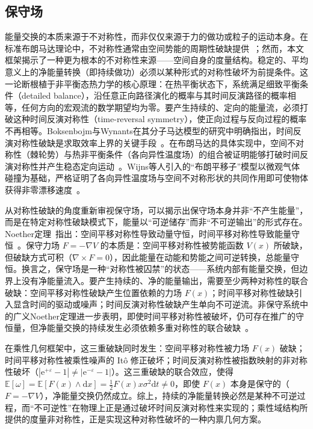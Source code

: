 ﻿\documentclass[10pt,a4paper]{article}
\numberwithin{equation}{section}
\begin{document}
\subsection{保守场}

能量交换的本质来源于不对称性，而非仅仅来源于力的做功或粒子的运动本身。在标准布朗马达理论中，不对称性通常由空间势能的周期性破缺提供~\cite{Reimann2002Brownian, Hanggi2009Brownian}；然而，本文框架揭示了一种更为根本的不对称性来源——空间自身的度量结构。稳定的、平均意义上的净能量转换（即持续做功）必须以某种形式的对称性破坏为前提条件。这一论断根植于非平衡态热力学的核心原理：在热平衡状态下，系统满足细致平衡条件（detailed balance），沿任意正向路径演化的概率与其时间反演路径的概率相等，任何方向的宏观流的数学期望均为零。要产生持续的、定向的能量流，必须打破这种时间反演对称性（time-reversal symmetry），使正向过程与反向过程的概率不再相等。Boksenbojm与Wynants在其分子马达模型的研究中明确指出，时间反演对称性破缺是求取效率上界的关键手段~\cite{Boksenbojm2009Entropy}。在布朗马达的具体实现中，空间不对称性（棘轮势）与热非平衡条件（各向异性温度场）的组合被证明能够打破时间反演对称性并产生稳态定向运动~\cite{Wijns2024Microscopic, Movilla2024Application}。Wijns等人引入的“布朗平移子”模型以微观气体碰撞为基础，严格证明了各向异性温度场与空间不对称形状的共同作用即可使物体获得非零漂移速度~\cite{Wijns2024Microscopic}。

从对称性破缺的角度重新审视保守场，可以揭示出保守场本身并非“不产生能量”，而是在特定对称性破缺模式下，能量以“可逆储存”而非“不可逆输出”的形式存在。Noether定理~\cite{Noether1918Invariante}指出：空间平移对称性导致动量守恒，时间平移对称性导致能量守恒~\cite{Landau1960Mechanics}。保守力场 $F = -\nabla V$ 的本质是：空间平移对称性被势能函数 $V(x)$ 所破缺，但破缺方式可积（$\nabla \times F = 0$），因此能量在动能和势能之间可逆转换，总能量守恒。换言之，保守场是一种“对称性被囚禁”的状态——系统内部有能量交换，但边界上没有净能量流入。要产生持续的、净的能量输出，需要至少两种对称性的联合破缺：空间平移对称性破缺产生位置依赖的力场 $F(x)$；时间平移对称性破缺引入显含时间的驱动或噪声；时间反演对称性破缺产生单向不可逆流。非保守系统中的广义Noether定理进一步表明，即使时间平移对称性被破坏，仍可存在推广的守恒量，但净能量交换的持续发生必须依赖多重对称性的联合破缺~\cite{Bravetti2019Contact}。

在乘性几何框架中，这三重破缺同时发生：空间平移对称性被力场 $F(x)$ 破缺；时间平移对称性被乘性噪声的 It\^o 修正破坏；时间反演对称性被指数映射的非对称性破坏（$|\mathrm e^{+\varepsilon}-1| \neq |\mathrm e^{-\varepsilon}-1|$）。这三重破缺的联合效应，使得 $\mathbb E[\omega] = \mathbb E[F(x)\wedge \mathrm dx] = \frac12 F(x)x\sigma^2\mathrm dt \neq 0$，即使 $F(x)$ 本身是保守的（$F = -\nabla V$），净能量交换仍然成立。综上，持续的净能量转换必然是某种不可逆过程，而“不可逆性”在物理上正是通过破坏时间反演对称性来实现的；乘性域结构所提供的度量非对称性，正是实现这种对称性破坏的一种内禀几何方案。
\end{document}
